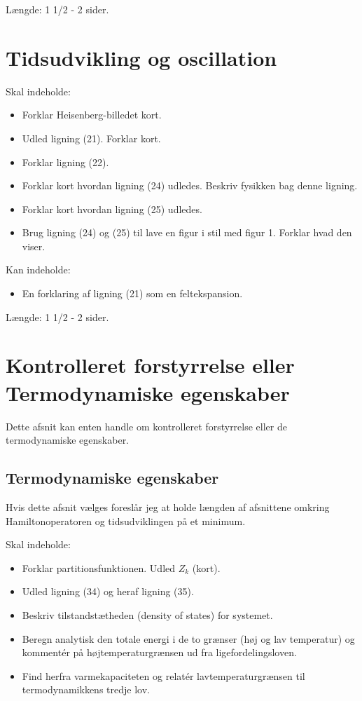 \documentclass[10pt]{article}
\begin{document}
Længde: 1 1/2 - 2 sider. 

\section{Tidsudvikling og oscillation}
Skal indeholde:
\begin{itemize}
\item Forklar Heisenberg-billedet kort.
\item Udled ligning (21). Forklar kort. 
\item Forklar ligning (22).
\item Forklar kort hvordan ligning (24) udledes. Beskriv fysikken bag denne ligning. 
\item Forklar kort hvordan ligning (25) udledes. 
\item Brug ligning (24) og (25) til lave en figur i stil med figur 1. Forklar hvad den viser.
\end{itemize}

Kan indeholde:
\begin{itemize}
\item En forklaring af ligning (21) som en feltekspansion. 
\end{itemize}

Længde: 1 1/2 - 2 sider. 


\section{Kontrolleret forstyrrelse eller Termodynamiske egenskaber}
Dette afsnit kan enten handle om kontrolleret forstyrrelse eller de termodynamiske egenskaber.

\subsection{Termodynamiske egenskaber}
Hvis dette afsnit vælges foreslår jeg at holde længden af afsnittene omkring Hamiltonoperatoren og tidsudviklingen på et minimum. 

Skal indeholde:
\begin{itemize}
\item Forklar partitionsfunktionen. Udled $Z_k$ (kort).
\item Udled ligning (34) og heraf ligning (35).
\item Beskriv tilstandstætheden (density of states) for systemet. 
\item Beregn analytisk den totale energi i de to grænser (høj og lav temperatur) og kommentér på højtemperaturgrænsen ud fra ligefordelingsloven.
\item Find herfra varmekapaciteten og relatér lavtemperaturgrænsen til termodynamikkens tredje lov.  
\end{itemize}
\end{document}
